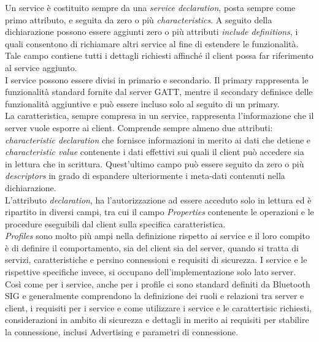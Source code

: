 \noindent Un service è costituito sempre da una \textit{service declaration}, posta sempre come primo attributo, e seguita da zero o più \textit{characteristics}. A seguito della dichiarazione possono essere aggiunti zero o più attributi \textit{include definitions}, i quali consentono di richiamare altri service al fine di estendere le funzionalità. Tale campo contiene tutti i dettagli richiesti affinché il client possa far riferimento al service aggiunto.\\
I service possono essere divisi in primario e secondario. Il primary rappresenta le funzionalità standard fornite dal server GATT, mentre il secondary definisce delle funzionalità aggiuntive e può essere incluso solo al seguito di un primary.\\

\noindent La caratteristica, sempre compresa in un service, rappresenta l'informazione che il server vuole esporre ai client. Comprende sempre almeno due attributi: \textit{characteristic declaration} che fornisce informazioni in merito ai dati che detiene e \textit{characteristic value} contenente i dati effettivi sui quali il client può accedere sia in lettura che in scrittura. Quest'ultimo campo può essere seguito da zero o più \textit{descriptors} in grado di espandere ulteriormente i meta-dati contenuti nella dichiarazione.\\
L'attributo \textit{declaration}, ha l'autorizzazione ad essere acceduto solo in lettura ed è ripartito in diversi campi, tra cui il campo \textit{Properties} contenente le operazioni e le procedure eseguibili dal client sulla specifica caratteristica.\\

\noindent \textit{Profiles} sono molto più ampi nella definizione rispetto ai service e il loro compito è di definire il comportamento, sia del client sia del server, quando si tratta di servizi, caratteristiche e persino connessioni e requisiti di sicurezza. I service e le rispettive specifiche invece, si occupano dell'implementazione solo lato server. Così come per i service, anche per i profile ci sono standard definiti da Bluetooth SIG e generalmente comprendono la definizione dei ruoli e relazioni tra server e client, i requisiti per i service e come utilizzare i service e le carattertisic richiesti, considerazioni in ambito di sicurezza e dettagli in merito ai requisiti per stabilire la connessione, inclusi Advertising e parametri di connessione.

